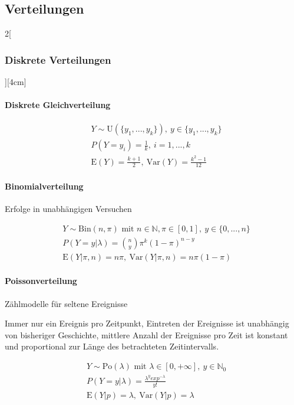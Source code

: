 \documentclass[8pt]{extarticle}
\begin{document}
\subsection{Verteilungen}

\begin{multicols}{2}[\subsubsection{Diskrete Verteilungen}][4cm]

  \paragraph{Diskrete Gleichverteilung}
  
    \begin{align*}
    & Y \sim \mathrm{U}(\{y_1, ..., y_k\}),\: y \in \{y_1, ..., y_k\} \\
    & P(Y=y_i) =\frac{1}{k},\: i = 1, ...,k \\
    & \mathrm{E}(Y) = \frac{k+1}{2} ,\: \mathrm{Var}(Y) = \frac{k^2 - 1}{12}
  \end{align*}
  
    \paragraph{Binomialverteilung}
  Erfolge in unabhängigen Versuchen 

  \begin{align*}
    & Y \sim \mathrm{Bin}(n, \pi) \text{ mit } n \in \mathbb{N}, \pi \in \left[0,1\right] ,\: y \in \{0, ..., n\} \\
    & P(Y=y|\lambda) = \binom{n}{y}\pi^k(1-\pi)^{n-y} \\
    & \mathrm{E}(Y|\pi,n) = n\pi ,\: \mathrm{Var}(Y|\pi,n) = n\pi(1-\pi)
  \end{align*}

  \paragraph{Poissonverteilung}
  Zählmodelle für seltene Ereignisse

\noindent Immer nur ein Ereignis pro Zeitpunkt, Eintreten der Ereignisse ist unabhängig von bisheriger Geschichte, mittlere Anzahl der Ereignisse pro Zeit ist konstant und proportional zur Länge des betrachteten Zeitintervalls.  

  \begin{align*}
    & Y \sim \mathrm{Po}(\lambda) \text{ mit } \lambda \in \left[ 0, + \infty \right] ,\: y \in \mathbb{N}_0 \\
    & P(Y=y|\lambda) =\frac{\lambda^y exp^{-\lambda}}{y!} \\
    & \mathrm{E}(Y|p) = \lambda ,\: \mathrm{Var}(Y|p) = \lambda
  \end{align*}


\end{multicols}
\end{document}
